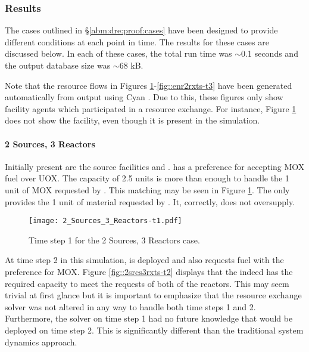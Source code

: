 \subsubsection{Results}

The cases outlined in \S \ref{abm:dre:proof:cases} have been designed to provide
different conditions at each point in time.  The results for these cases are
discussed below. In each of these cases, the total \Cyclus{} run time was
$\sim$0.1 seconds and the output database size was $\sim$68 kB.

Note that the resource flows in Figures
\ref{fig::2srcs3rxts-t1}-\ref{fig::enr2rxts-t3} have been generated
automatically from \Cyclus{} output using Cyan \cite{Carlsen2014}.  Due to this,
these figures only show facility agents which participated in a resource
exchange. For instance, Figure \ref{fig::2srcs3rxts-t1} does not show the
\UOXSource{} facility, even though it is present in the simulation.

\paragraph{2 Sources, 3 Reactors}

Initially present are the source facilities and .   has a
preference for accepting MOX fuel over UOX.  The \MOXSource{} capacity of 2.5
units is more than enough to handle the 1 unit of MOX requested by .
This matching may be seen in Figure \ref{fig::2srcs3rxts-t1}. The \MOXSource{}
only provides the 1 unit of material requested by .  It, correctly,
does not oversupply.

\begin{figure}
  \begin{center}
    \texttt{[image: 2\_Sources\_3\_Reactors-t1.pdf]}
    \caption[]{\label{fig::2srcs3rxts-t1}Time step 1 for the 2 Sources, 3 Reactors 
        case.}
  \end{center}
\end{figure}

At time step 2 in this simulation,  is deployed and also requests
fuel with the preference for MOX.  Figure \ref{fig::2srcs3rxts-t2} displays that
the \MOXSource{} indeed has the required capacity to meet the requests of both
of the reactors.  This may seem trivial at first glance but it is important to
emphasize that the resource exchange solver was not altered in any way to handle
both time steps 1 and 2.  Furthermore, the solver on time step 1 had no future
knowledge that  would be deployed on time step 2.  This is
significantly different than the traditional system dynamics approach.

